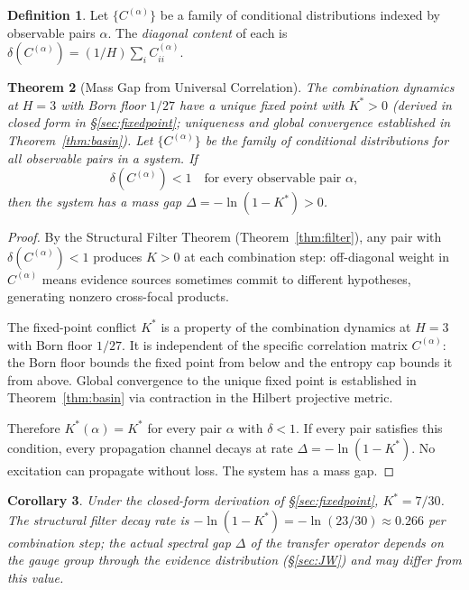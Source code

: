 \documentclass[11pt,a4paper]{article}
\newtheorem{theorem}{Theorem}[section]
\newtheorem{corollary}[theorem]{Corollary}
\theoremstyle{definition}
\newtheorem{definition}[theorem]{Definition}
\theoremstyle{remark}
\begin{document}
\begin{definition}\label{def:diagonal}
Let $\{C^{(\alpha)}\}$ be a family of conditional distributions indexed by observable pairs $\alpha$. The \emph{diagonal content} of each is $\delta(C^{(\alpha)})=(1/H)\sum_i C^{(\alpha)}_{ii}$.
\end{definition}

\begin{theorem}[Mass Gap from Universal Correlation]\label{thm:massgap}
The combination dynamics at $H=3$ with Born floor $1/27$ have a unique fixed point with $K^*>0$ (derived in closed form in \S\ref{sec:fixedpoint}; uniqueness and global convergence established in Theorem~\ref{thm:basin}). Let $\{C^{(\alpha)}\}$ be the family of conditional distributions for all observable pairs in a system. If
\begin{equation}\label{eq:delta}
\delta(C^{(\alpha)})<1 \quad\text{for every observable pair }\alpha,
\end{equation}
then the system has a mass gap $\Delta=-\ln(1-K^*)>0$.
\end{theorem}

\begin{proof}
By the Structural Filter Theorem (Theorem~\ref{thm:filter}), any pair with $\delta(C^{(\alpha)})<1$ produces $K>0$ at each combination step: off-diagonal weight in $C^{(\alpha)}$ means evidence sources sometimes commit to different hypotheses, generating nonzero cross-focal products.

The fixed-point conflict $K^*$ is a property of the combination dynamics at $H=3$ with Born floor $1/27$. It is independent of the specific correlation matrix $C^{(\alpha)}$: the Born floor bounds the fixed point from below and the entropy cap bounds it from above. Global convergence to the unique fixed point is established in Theorem~\ref{thm:basin} via contraction in the Hilbert projective metric.

Therefore $K^*(\alpha)=K^*$ for every pair $\alpha$ with $\delta<1$. If every pair satisfies this condition, every propagation channel decays at rate $\Delta=-\ln(1-K^*)$. No excitation can propagate without loss. The system has a mass gap.
\end{proof}

\begin{corollary}\label{cor:gap}
Under the closed-form derivation of \S\ref{sec:fixedpoint}, $K^*=7/30$. The structural filter decay rate is $-\ln(1-K^*)=-\ln(23/30)\approx 0.266$ per combination step; the actual spectral gap $\Delta$ of the transfer operator depends on the gauge group through the evidence distribution (\S\ref{sec:JW}) and may differ from this value.
\end{corollary}
\end{document}
